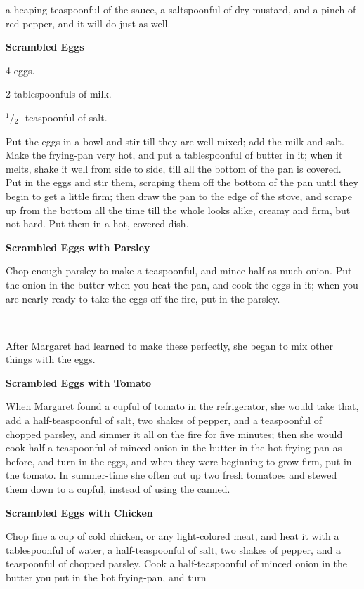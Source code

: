 \documentclass[11pt]{book}
\newcommand{\indpar}{\par\noindent\hspace*{\parindent}}
\newcommand{\ingredient}{\indpar}
\newcommand{\instruction}{\indpar}
\newcommand{\OneHalf}{\ensuremath{{}^1\!\!/\!{}_2\mbox{\ }}}
\newenvironment{RecipeTitle}{\medskip\begin{center}\large\bf }{\end{center}\smallskip}
\begin{document}
a heaping teaspoonful of the sauce, a saltspoonful of dry mustard,
and a pinch of red pepper, and it will do just as well.
\begin{RecipeTitle}
Scrambled Eggs\label{scrambled_eggs}
\end{RecipeTitle}
\ingredient  4 eggs.
\ingredient  2 tablespoonfuls of milk.
\ingredient  \OneHalf teaspoonful of salt.
\instruction
  Put the eggs in a bowl and stir till they are well mixed; add the
milk and salt.  Make the frying-pan very hot, and put a tablespoonful
of butter in it; when it melts, shake it well from side to side, till
all the bottom of the pan is covered.  Put in the eggs and stir them,
scraping them off the bottom of the pan until they begin to get a
little firm; then draw the pan to the edge of the stove, and scrape up
from the bottom all the time till the whole looks alike, creamy and
firm, but not hard.  Put them in a hot, covered dish.
\begin{RecipeTitle}
Scrambled Eggs with Parsley\label{scrambled_eggs_with_parsley}
\end{RecipeTitle}
\instruction
  Chop enough parsley to make a teaspoonful, and mince half as much
onion.  Put the onion in the butter when you heat the pan, and cook
the eggs in it; when you are nearly ready to take the eggs off the fire,
put in the parsley.
\indpar\ \indpar
  After Margaret had learned to make these perfectly, she began to mix
other things with the eggs.
\begin{RecipeTitle}
Scrambled Eggs with Tomato\label{scrambled_eggs_with_tomato}
\end{RecipeTitle}
\instruction
  When Margaret found a cupful of tomato in the refrigerator, she would
take that, add a half-teaspoonful of salt, two shakes of pepper, and a
teaspoonful of chopped parsley, and simmer it all on the fire for
five minutes; then she would cook half a teaspoonful of minced onion
in the butter in the hot frying-pan as before, and turn in the eggs,
and when they were beginning to grow firm, put in the tomato.  In
summer-time she often cut up two fresh tomatoes and stewed them down
to a cupful, instead of using the canned.
\begin{RecipeTitle}
Scrambled Eggs with Chicken\label{scrambled_eggs_with_chicken}
\end{RecipeTitle}
\instruction
  Chop fine a cup of cold chicken, or any light-colored meat, and heat
it with a tablespoonful of water, a half-teaspoonful of salt, two shakes
of pepper, and a teaspoonful of chopped parsley.  Cook a half-teaspoonful
of minced onion in the butter you put in the hot frying-pan, and turn
\end{document}
